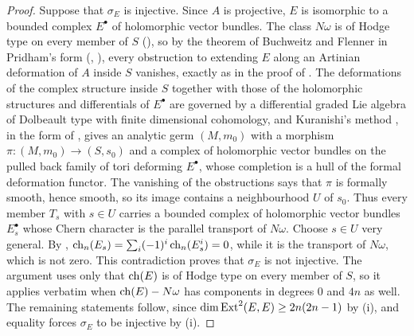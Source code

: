 \begin{proof}
Suppose that $\sigma_{E}$ is injective. Since $A$ is projective, $E$ is isomorphic to
a bounded complex $E^{\bullet}$ of holomorphic vector bundles. The class
$N\omega$ is of Hodge type on every member of $S$ (), so
by the theorem of Buchweitz and Flenner in Pridham's form (,
\cite{BF03,Pri24}), every obstruction to extending $E$ along an
Artinian deformation of $A$ inside $S$ vanishes, exactly as in the proof of
. The deformations of the complex structure inside
$S$ together with those of the holomorphic structures and differentials of
$E^{\bullet}$ are governed by a differential graded Lie algebra of Dolbeault
type with finite dimensional cohomology, and Kuranishi's method
\cite{Kur65}, in the form of \cite[Sections~2--3]{GM88}, gives an analytic
germ $(M,m_{0})$ with a morphism $\pi\colon(M,m_{0})\to(S,s_{0})$ and a
complex of holomorphic vector bundles on the pulled back family of tori
deforming $E^{\bullet}$, whose completion is a hull of the formal deformation
functor. The vanishing of the obstructions says that $\pi$ is formally
smooth, hence smooth, so its image contains a neighbourhood $U$ of $s_{0}$.
Thus every member $T_{s}$ with $s\in U$ carries a bounded complex of
holomorphic vector bundles $E_{s}^{\bullet}$ whose Chern character is the
parallel transport of $N\omega$. Choose $s\in U$ very general. By
,
$\operatorname{ch}_{n}(E_{s})=\sum_{i}(-1)^{i}\operatorname{ch}_{n}(E_{s}^{i})=0$, while it is the
transport of $N\omega$, which is not zero. This contradiction proves that
$\sigma_{E}$ is not injective. The argument uses only that $\operatorname{ch}(E)$ is of
Hodge type on every member of $S$, so it applies verbatim when $\operatorname{ch}(E)-N\omega$
has components in degrees $0$ and $4n$ as well. The remaining statements
follow, since $\dim\operatorname{Ext}^{2}(E,E)\ge2n(2n-1)$ by (i),
and equality forces $\sigma_{E}$ to be injective by
(i).
\end{proof}

